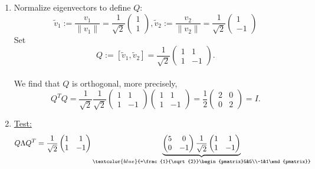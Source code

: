 {\begin{enumerate}
\begin{enumerate}
\begin{align*}
		&\Leftrightarrow 3v_1^{\textcolor{red}{2}}+3v_2^{\textcolor{red}{2}} =0\\
		&\Leftrightarrow v_1^{\textcolor{red}{2}} =- v_2^{\textcolor{red}{2}}.
		\end{align*}
		Choose, e.g., $v^{\textcolor{red}{2}} = \begin{pmatrix}1\\-1\end{pmatrix}$.
	\end{enumerate}
	\item Normalize eigenvectors to define $Q$:\\
	$$\tilde{v}_1:=\frac{v_1}{\| v_1\|}=\frac{1}{\sqrt{2}}\begin{pmatrix}1\\1\end{pmatrix}, \tilde{v}_2:=\frac{v_2}{\| v_2\|}=\frac{1}{\sqrt{2}}\begin{pmatrix}1\\-1\end{pmatrix}$$
	Set $$Q:=[\tilde{v}_1, \tilde{v}_2] = \frac{1}{\sqrt{2}}\begin{pmatrix}1&1\\1&-1\end{pmatrix}.$$\\
	We find that $Q$ is orthogonal, more precisely, $$Q^TQ =\frac{1}{\sqrt{2}}\frac{1}{\sqrt{2}}\begin{pmatrix}1&1\\1&-1\end{pmatrix}\begin{pmatrix}1&1\\1&-1\end{pmatrix}=\frac{1}{2}\begin{pmatrix}2&0\\0&2\end{pmatrix} = I.$$
	\item 
	\underline{Test:} 
	\begin{align*} 
	Q\Lambda Q^T &=\frac{1}{\sqrt{2}}\begin{pmatrix} 1&1\\1&-1\end{pmatrix}\underbrace{\begin{pmatrix}5&0\\0&-1\end{pmatrix}\frac{1}{\sqrt{2}}\begin{pmatrix}1&1\\1&-1\end{pmatrix}}_{\textcolor{blue}{=\frac{1}{\sqrt{2}}\begin{pmatrix}5&5\\-1&1\end{pmatrix}}}\\

\end{align*}
\end{enumerate}}
